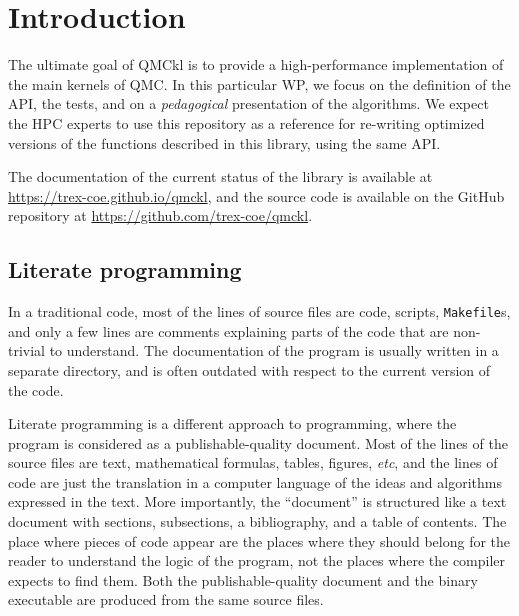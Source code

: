 \newcommand{\orgmode}{\texttt{org-mode}}
\newcommand{\Makefile}{\texttt{Makefile}}
\newcommand{\context}{\texttt{context}}
\newcommand{\CC}{C\nolinebreak\hspace{-.05em}\raisebox{.4ex}{\tiny\bf +}\nolinebreak\hspace{-.10em}\raisebox{.4ex}{\tiny\bf +}}
\def\CC{{C\nolinebreak[4]\hspace{-.05em}\raisebox{.4ex}{\tiny\bf ++}}}

\section{Introduction}


The ultimate goal of \ac{QMCkl} is to provide a high-performance
implementation of the main kernels of \ac{QMC}. In this particular
\ac{WP}, we focus on the definition of the \ac{API}, the tests,
and on a \emph{pedagogical} presentation of the algorithms.  We expect
the \ac{HPC} experts to use this repository as a reference for re-writing
optimized versions of the functions described in this library, using
the same \ac{API}.

The documentation of the current status of the library is available
at \url{https://trex-coe.github.io/qmckl}, and the source code is
available on the GitHub repository at \url{https://github.com/trex-coe/qmckl}.


\subsection{Literate programming}

In a traditional code, most of the lines of source files are code,
scripts, {\Makefile}s, and only a few lines are comments explaining
parts of the code that are non-trivial to understand. The
documentation of the program is usually written in a separate
directory, and is often outdated with respect to the current version
of the code.

Literate programming\cite{knuth_1992} is a different approach to
programming, where the program is considered as a publishable-quality
document. Most of the lines of the source files are text,
mathematical formulas, tables, figures, \textit{etc}, and the lines of
code are just the translation in a computer language of the ideas
and algorithms expressed in the text. More importantly, the ``document'' is
structured like a text document with sections, subsections, a bibliography, and a table of contents. The place where pieces of code
appear are the places where they should belong for the reader to
understand the logic of the program, not the places where the compiler
expects to find them. Both the publishable-quality document and the
binary executable are produced from the same source files. 

